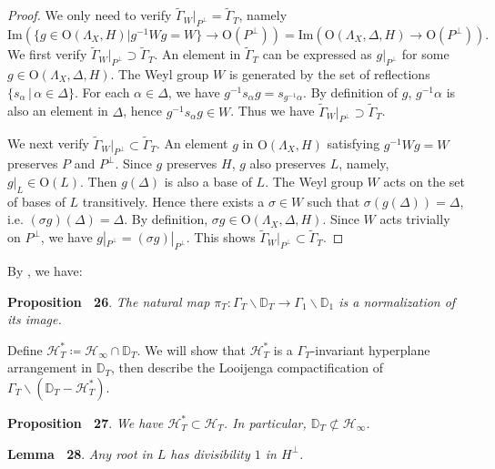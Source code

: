 \documentclass[
]{article}
\begin{document}
\emph{Proof.} We only need to verify
\(\widetilde{\Gamma}_W|_{P^\perp}=\widetilde{\Gamma}_T\), namely
\[\mathrm{Im}( \{ g\in \mathrm{O}(\Lambda_X,H) \big| g^{-1}Wg=W \} \to \mathrm{O}(P^\perp) ) = \mathrm{Im} ( \mathrm{O}(\Lambda_X,\Delta,H) \to \mathrm{O}(P^\perp) ).\]
We first verify
\(\widetilde\Gamma_W|_{P^\perp} \supset \widetilde\Gamma_T\). An element
in \(\widetilde\Gamma_T\) can be expressed as \(g|_{P^\perp}\) for some
\(g\in \mathrm{O}(\Lambda_X,\Delta,H)\). The Weyl group \(W\) is
generated by the set of reflections
\(\{ s_\alpha \,|\, \alpha\in \Delta \}\). For each
\(\alpha\in \Delta\), we have \(g^{-1} s_\alpha g = s_{g^{-1}\alpha}\).
By definition of \(g\), \(g^{-1}\alpha\) is also an element in
\(\Delta\), hence \(g^{-1} s_\alpha g \in W\). Thus we have
\(\widetilde\Gamma_W|_{P^\perp} \supset \widetilde\Gamma_T\).

We next verify
\(\widetilde\Gamma_W|_{P^\perp} \subset \widetilde\Gamma_T\). An element
\(g\) in \(\mathrm{O}(\Lambda_X,H)\) satisfying \(g^{-1}Wg=W\) preserves
\(P\) and \(P^\perp\). Since \(g\) preserves \(H\), \(g\) also preserves
\(L\), namely, \(g|_{L}\in \mathrm{O}(L)\). Then \(g(\Delta)\) is also a
base of \(L\). The Weyl group \(W\) acts on the set of bases of \(L\)
transitively. Hence there exists a \(\sigma\in W\) such that
\(\sigma (g(\Delta)) = \Delta\), i.e. \((\sigma g) (\Delta) = \Delta\).
By definition, \(\sigma g\in \mathrm{O}(\Lambda_X,\Delta,H)\). Since
\(W\) acts trivially on \(P^\perp\), we have
\(g|_{P^\perp} = (\sigma g)|_{P^\perp}\). This shows
\(\widetilde\Gamma_W|_{P^\perp} \subset \widetilde\Gamma_T\).~◻

By \cite[Proposition A.5]{yu2020fourfolds}, we have:

\textbf{Proposition~ 26}. \emph{The natural map
\(\pi_T\colon \Gamma_T\backslash \mathbb{D}_T \to \Gamma_1\backslash \mathbb{D}_1\)
is a normalization of its image.}

Define \(\mathcal{H}_T^*\coloneqq\mathcal{H}_\infty\cap\mathbb{D}_T\).
We will show that \(\mathcal{H}_T^*\) is a \(\Gamma_T\)-invariant
hyperplane arrangement in \(\mathbb{D}_T\), then describe the Looijenga
compactification of
\(\Gamma_T\backslash(\mathbb{D}_T-\mathcal{H}_T^*)\).

\textbf{Proposition~ 27}. \emph{\label{prop: calH_* subset calH_T} We
have \(\mathcal{H}_T^*\subset\mathcal{H}_T\). In particular,
\(\mathbb{D}_T\not\subset\mathcal{H}_\infty\).}

\textbf{Lemma~ 28}. \emph{\label{lem: div(root in L)=1} Any root in
\(L\) has divisibility \(1\) in \(H^\perp\).}
\end{document}
